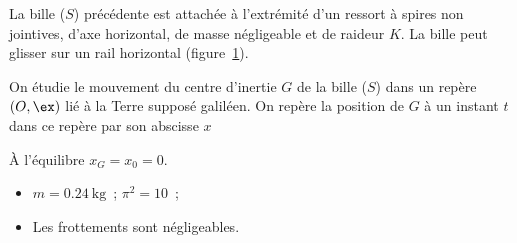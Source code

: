 \begin{minipage}{0.67\linewidth}
    La bille ($S$) précédente est attachée à l'extrémité d'un ressort à spires
    non jointives, d'axe horizontal, de masse négligeable et de raideur $K$. La
    bille peut glisser sur un rail horizontal (figure~\ref{fig:solide_ressort}).
    
    On étudie le mouvement du centre d'inertie $G$ de la bille ($S$) dans un
    repère $(O,\ex)$ lié à la Terre supposé galiléen. On repère la position de
    $G$ à un instant $t$ dans ce repère par son abscisse $x$
    
    À l'équilibre $x_{G}=x_{0}=0$.
\end{minipage}
\hfill
\begin{minipage}{0.30\linewidth}
    \begin{figure}[H]
        \centering
        
        \caption{}
        \label{fig:solide_ressort}
    \end{figure}
\end{minipage}

\begin{donnees}
    \begin{itemize}
        \item $m=\qty{0,24}{\kg}$~; $\pi^{2}=10$~;
        \item Les frottements sont négligeables.
    \end{itemize}
\end{donnees}

